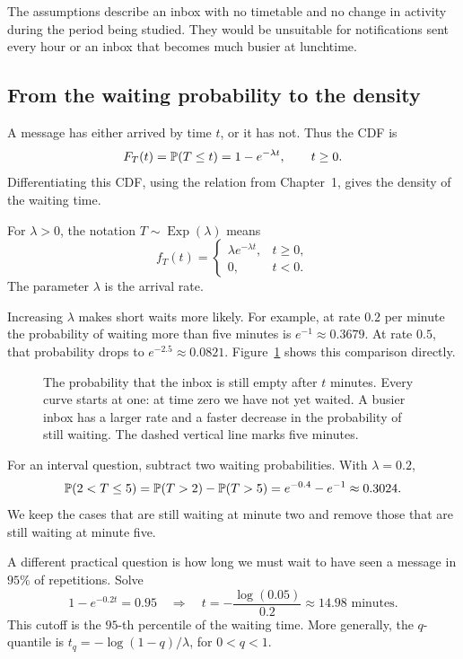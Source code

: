 The assumptions describe an inbox with no timetable and no change in
activity during the period being studied. They would be unsuitable for
notifications sent every hour or an inbox that becomes much busier at
lunchtime.

\subsection{From the waiting probability to the density}

A message has either arrived by time \(t\), or it has not. Thus the CDF is
\[
  F_T(t)=\mathbb{P}(T\le t)=1-e^{-\lambda t},\qquad t\ge0.
\]
Differentiating this CDF, using the relation from Chapter~1, gives the
density of the waiting time.

\begin{definition}
For \(\lambda>0\), the notation \(T\sim\operatorname{Exp}(\lambda)\) means
\[
  f_T(t)=
  \begin{cases}
    \lambda e^{-\lambda t},&t\ge0,\\
    0,&t<0.
  \end{cases}
\]
The parameter \(\lambda\) is the arrival rate.
\end{definition}

Increasing \(\lambda\) makes short waits more likely. For example, at rate
\(0.2\) per minute the probability of waiting more than five minutes is
\(e^{-1}\approx0.3679\). At rate \(0.5\), that probability drops to
\(e^{-2.5}\approx0.0821\). Figure~\ref{fig:exponential-wait} shows this
comparison directly.

\begin{figure}[htbp]
  \centering
  
  \caption{The probability that the inbox is still empty after \(t\) minutes.
  Every curve starts at one: at time zero we have not yet waited.
  A busier inbox has a larger rate and a faster decrease in the probability
  of still waiting. The dashed vertical line marks five minutes.}
  \label{fig:exponential-wait}
\end{figure}

For an interval question, subtract two waiting probabilities. With
\(\lambda=0.2\),
\[
  \mathbb{P}(2<T\le5)
  =\mathbb{P}(T>2)-\mathbb{P}(T>5)
  =e^{-0.4}-e^{-1}\approx0.3024.
\]
We keep the cases that are still waiting at minute two and remove those
that are still waiting at minute five.

A different practical question is how long we must wait to have seen a
message in \(95\%\) of repetitions. Solve
\[
  1-e^{-0.2t}=0.95
  \quad\Longrightarrow\quad
  t=-\frac{\log(0.05)}{0.2}\approx14.98\text{ minutes}.
\]
This cutoff is the \(95\)-th percentile of the waiting time. More
generally, the \(q\)-quantile is
\(t_q=-\log(1-q)/\lambda\), for \(0<q<1\).

